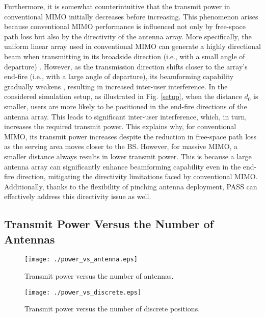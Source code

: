 Furthermore, it is somewhat counterintuitive that the transmit power in conventional MIMO initially decreases before increasing. This phenomenon arises because conventional MIMO performance is influenced not only by free-space path loss but also by the directivity of the antenna array. More specifically, the uniform linear array used in conventional MIMO can generate a highly directional beam when transmitting in its broadside direction (i.e., with a small angle of departure) \cite{kallnichev2001analysis}. However, as the transmission direction shifts closer to the array's end-fire (i.e., with a large angle of departure), its beamforming capability gradually weakens \cite{kallnichev2001analysis}, resulting in increased inter-user interference. In the considered simulation setup, as illustrated in Fig. \ref{setup}, when the distance $d_0$ is smaller, users are more likely to be positioned in the end-fire directions of the antenna array. This leads to significant inter-user interference, which, in turn, increases the required transmit power. This explains why, for conventional MIMO, its transmit power increases despite the reduction in free-space path loss as the serving area moves closer to the BS. However, for massive MIMO, a smaller distance always results in lower transmit power. This is because a large antenna array can significantly enhance beamforming capability even in the end-fire direction, mitigating the directivity limitations faced by conventional MIMO. Additionally, thanks to the flexibility of pinching antenna deployment, PASS can effectively address this directivity issue as well.

\subsection{Transmit Power Versus the Number of Antennas}

\begin{figure}[t!]
  \centering
  \texttt{[image: ./power\_vs\_antenna.eps]}
  \caption{Transmit power versus the number of antennas.}
  \label{power_vs_antenna}
\end{figure}

\begin{figure}[t!]
  \centering
  \texttt{[image: ./power\_vs\_discrete.eps]}
  \caption{Transmit power versus the number of discrete positions.}
  \label{power_vs_discrete}
\end{figure}


